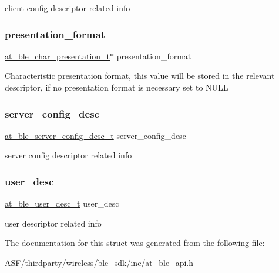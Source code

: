 client config descriptor related info \mbox{\label{structat__ble__chr__t_a6309826fe45ca7d0688ead29f7ae01a2}} 
\subsubsection{\texorpdfstring{presentation\_format}{presentation\_format}}
{\footnotesize\ttfamily \mbox{\hyperlink{structat__ble__char__presentation__t}{at\+\_\+ble\+\_\+char\+\_\+presentation\+\_\+t}}$\ast$ presentation\+\_\+format}

Characteristic presentation format, this value will be stored in the relevant descriptor, if no presentation format is necessary set to N\+U\+LL \mbox{\label{structat__ble__chr__t_a86841983968e9b128b405a07b1d561f0}} 
\subsubsection{\texorpdfstring{server\_config\_desc}{server\_config\_desc}}
{\footnotesize\ttfamily \mbox{\hyperlink{structat__ble__server__config__desc__t}{at\+\_\+ble\+\_\+server\+\_\+config\+\_\+desc\+\_\+t}} server\+\_\+config\+\_\+desc}

server config descriptor related info \mbox{\label{structat__ble__chr__t_aa5f716c0c5eb03aba5fe0c7eb5f097b0}} 
\subsubsection{\texorpdfstring{user\_desc}{user\_desc}}
{\footnotesize\ttfamily \mbox{\hyperlink{structat__ble__user__desc__t}{at\+\_\+ble\+\_\+user\+\_\+desc\+\_\+t}} user\+\_\+desc}

user descriptor related info 

The documentation for this struct was generated from the following file\+:\begin{DoxyCompactItemize}
\item 
A\+S\+F/thirdparty/wireless/ble\+\_\+sdk/inc/\mbox{\hyperlink{at__ble__api_8h}{at\+\_\+ble\+\_\+api.\+h}}\end{DoxyCompactItemize}
